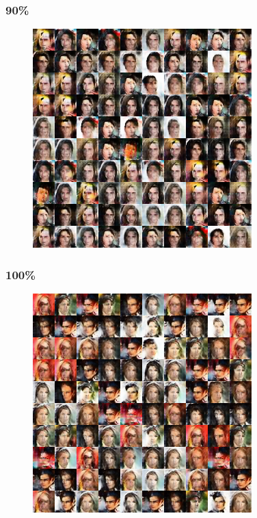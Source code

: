 \documentclass[dvipdfmx,12pt]{beamer}
\begin{document}
\begin{frame}
	\frametitle{90\%}
	\begin{figure}[htbp]
	\begin{center}
	\includegraphics[width=0.7\hsize]{./dcgan/image00090000.png}
	\end{center}
	\end{figure}
\end{frame}
\begin{frame}
	\frametitle{100\%}
	\begin{figure}[htbp]
	\begin{center}
	\includegraphics[width=0.7\hsize]{./dcgan/image00100000.png}
	\end{center}
	\end{figure}
\end{frame}
\end{document}
